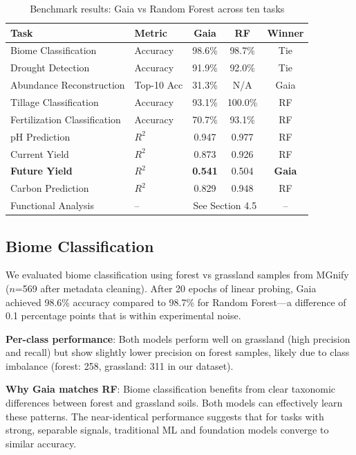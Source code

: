 \documentclass[11pt,a4paper]{article}
\begin{document}
\begin{table}[H]
\centering
\caption{Benchmark results: Gaia vs Random Forest across ten tasks}
\label{tab:results}
\begin{tabular}{llccc}
\toprule
\textbf{Task} & \textbf{Metric} & \textbf{Gaia} & \textbf{RF} & \textbf{Winner} \\
\midrule
Biome Classification & Accuracy & 98.6\% & 98.7\% & Tie \\
Drought Detection & Accuracy & 91.9\% & 92.0\% & Tie \\
Abundance Reconstruction & Top-10 Acc & 31.3\% & N/A & Gaia \\
Tillage Classification & Accuracy & 93.1\% & 100.0\% & RF \\
Fertilization Classification & Accuracy & 70.7\% & 93.1\% & RF \\
pH Prediction & $R^2$ & 0.947 & 0.977 & RF \\
Current Yield & $R^2$ & 0.873 & 0.926 & RF \\
\textbf{Future Yield} & $R^2$ & \textbf{0.541} & 0.504 & \textbf{Gaia} \\
Carbon Prediction & $R^2$ & 0.829 & 0.948 & RF \\
Functional Analysis & -- & \multicolumn{2}{c}{See Section 4.5} & -- \\
\bottomrule
\end{tabular}
\end{table}

\subsection{Biome Classification}

We evaluated biome classification using forest vs grassland samples from MGnify ($n$=569 after metadata cleaning). After 20 epochs of linear probing, Gaia achieved 98.6\% accuracy compared to 98.7\% for Random Forest---a difference of 0.1 percentage points that is within experimental noise.

\textbf{Per-class performance}: Both models perform well on grassland (high precision and recall) but show slightly lower precision on forest samples, likely due to class imbalance (forest: 258, grassland: 311 in our dataset).

\textbf{Why Gaia matches RF}: Biome classification benefits from clear taxonomic differences between forest and grassland soils. Both models can effectively learn these patterns. The near-identical performance suggests that for tasks with strong, separable signals, traditional ML and foundation models converge to similar accuracy.
\end{document}
